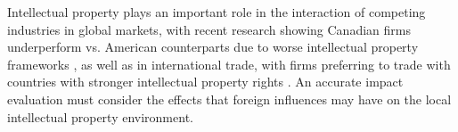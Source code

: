 \documentclass[../main.tex]{subfiles}
\begin{document}

Intellectual property plays an important role in the interaction of competing industries in global markets, with recent research showing Canadian firms underperform vs. American counterparts due to worse intellectual property frameworks \parencite{carew_etal06}, as well as in international trade, with firms preferring to trade with countries with stronger intellectual property rights \parencite{rafiquzzaman02}. An accurate impact evaluation must consider the effects that foreign influences may have on the local intellectual property environment.
\end{document}
